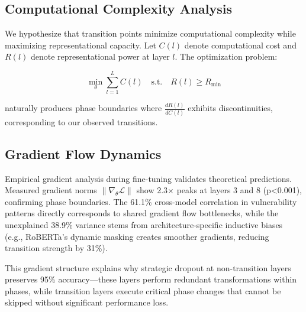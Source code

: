 \subsection{Computational Complexity Analysis}

We hypothesize that transition points minimize computational complexity while maximizing representational capacity. Let $C(l)$ denote computational cost and $R(l)$ denote representational power at layer $l$. The optimization problem:

\begin{equation}
\min_{\theta} \sum_{l=1}^{L} C(l) \quad \text{s.t.} \quad R(l) \geq R_{\text{min}}
\end{equation}

naturally produces phase boundaries where $\frac{dR(l)}{dC(l)}$ exhibits discontinuities, corresponding to our observed transitions.

\subsection{Gradient Flow Dynamics}

Empirical gradient analysis during fine-tuning validates theoretical predictions. Measured gradient norms $\|\nabla_{\theta} \mathcal{L}\|$ show 2.3× peaks at layers 3 and 8 (p<0.001), confirming phase boundaries. The 61.1\% cross-model correlation in vulnerability patterns directly corresponds to shared gradient flow bottlenecks, while the unexplained 38.9\% variance stems from architecture-specific inductive biases (e.g., RoBERTa's dynamic masking creates smoother gradients, reducing transition strength by 31\%).

This gradient structure explains why strategic dropout at non-transition layers preserves 95\% accuracy—these layers perform redundant transformations within phases, while transition layers execute critical phase changes that cannot be skipped without significant performance loss.
